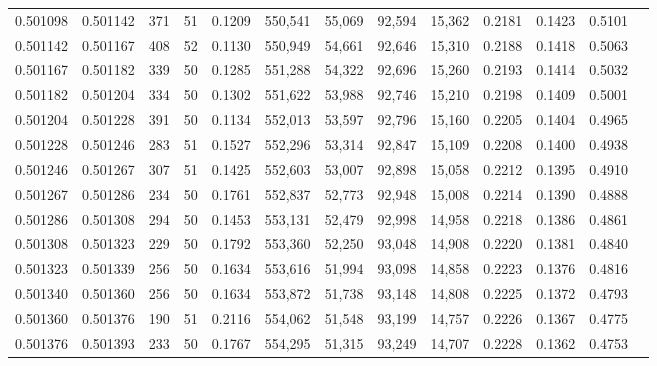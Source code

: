 \begin{tabular}{rrrrrrrrrrrrr}
0.501098 & 0.501142 & 371 &  51 &                                     0.1209 & 550,541 &  55,069 &  92,594 &  15,362 & 0.2181 & 0.1423 & 0.5101 \\
0.501142 & 0.501167 & 408 &  52 &                                     0.1130 & 550,949 &  54,661 &  92,646 &  15,310 & 0.2188 & 0.1418 & 0.5063 \\
0.501167 & 0.501182 & 339 &  50 &                                     0.1285 & 551,288 &  54,322 &  92,696 &  15,260 & 0.2193 & 0.1414 & 0.5032 \\
0.501182 & 0.501204 & 334 &  50 &                                     0.1302 & 551,622 &  53,988 &  92,746 &  15,210 & 0.2198 & 0.1409 & 0.5001 \\
0.501204 & 0.501228 & 391 &  50 &                                     0.1134 & 552,013 &  53,597 &  92,796 &  15,160 & 0.2205 & 0.1404 & 0.4965 \\
0.501228 & 0.501246 & 283 &  51 &                                     0.1527 & 552,296 &  53,314 &  92,847 &  15,109 & 0.2208 & 0.1400 & 0.4938 \\
0.501246 & 0.501267 & 307 &  51 &                                     0.1425 & 552,603 &  53,007 &  92,898 &  15,058 & 0.2212 & 0.1395 & 0.4910 \\
0.501267 & 0.501286 & 234 &  50 &                                     0.1761 & 552,837 &  52,773 &  92,948 &  15,008 & 0.2214 & 0.1390 & 0.4888 \\
0.501286 & 0.501308 & 294 &  50 &                                     0.1453 & 553,131 &  52,479 &  92,998 &  14,958 & 0.2218 & 0.1386 & 0.4861 \\
0.501308 & 0.501323 & 229 &  50 &                                     0.1792 & 553,360 &  52,250 &  93,048 &  14,908 & 0.2220 & 0.1381 & 0.4840 \\
0.501323 & 0.501339 & 256 &  50 &                                     0.1634 & 553,616 &  51,994 &  93,098 &  14,858 & 0.2223 & 0.1376 & 0.4816 \\
0.501340 & 0.501360 & 256 &  50 &                                     0.1634 & 553,872 &  51,738 &  93,148 &  14,808 & 0.2225 & 0.1372 & 0.4793 \\
0.501360 & 0.501376 & 190 &  51 &                                     0.2116 & 554,062 &  51,548 &  93,199 &  14,757 & 0.2226 & 0.1367 & 0.4775 \\
0.501376 & 0.501393 & 233 &  50 &                                     0.1767 & 554,295 &  51,315 &  93,249 &  14,707 & 0.2228 & 0.1362 & 0.4753 \\

\end{tabular}
